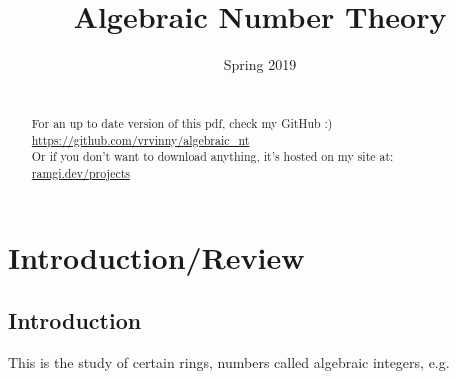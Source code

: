 \documentclass[11pt]{article}
\begin{document}
\newtheorem{theorem}{Theorem}[section]
\newtheorem{defn}[theorem]{Definition}
\newtheorem{prop}[theorem]{Proposition}
\newtheorem{cor}[theorem]{Corollary}
\newtheorem{lemma}[theorem]{Lemma}
\newcommand{\R}{\mathbb{R}}
\newcommand{\Z}{\mathbb{Z}}
\newcommand{\C}{\mathbb{C}}
\newcommand{\Q}{\mathbb{Q}}
\newcommand{\A}{\alpha}
\newcommand{\aaa}{\alpha}
\newcommand{\z}{\zeta}
\newcommand{\ring}{\mathcal{O}}
\newcommand{\spa}{$ $\\[-0.5em]}
\newcommand{\spac}{$ $\\[1em]}
\newcommand{\B}{\beta}
\newcommand{\G}{\gamma}
\newcommand{\bba}{\mathcal{B}}
\newcommand{\dd}{\Delta}
\newcommand{\ttt}{\theta}
\newcommand{\phh}{\varphi}
\newcommand{\ff}{\mathbb{F}}
\newcommand{\ii}{\mathcal{I}}
\newcommand{\pp}{\mathcal{P}}






\title{Algebraic Number Theory}
\author{}
	\date{Spring 2019}
	\maketitle


\newpage
	\begin{abstract}

		 \\[2em]

		For an up to date version of this pdf, check my GitHub :)\\[0.5em]
		\href{https://github.com/vrvinny/algebraic\_nt}{https://github.com/vrvinny/algebraic\_nt}
		$ $\\[1em]
		Or if you don't want to download anything, it's hosted on my site at: $ $\\[1em]

		\href{https://ramgi.dev/projects}{ramgi.dev/projects}

	\end{abstract}
\newpage
\tableofcontents{}
\newpage
	\section{Introduction/Review}
	\subsection{Introduction}
		This is the study of certain rings, numbers called algebraic integers, e.g. 
	
\end{document}
